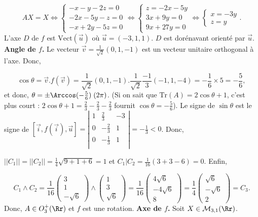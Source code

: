 {{$$AX=X\Leftrightarrow\left\{
\begin{array}{l}
-x-y-2z=0\\
-2x-5y-z=0\\
-x+2y-5z=0
\end{array}
\right.\Leftrightarrow\left\{
\begin{array}{l}
z=-2x-5y\\
3x+9y=0\\
9x+27y=0
\end{array}
\right.\Leftrightarrow\left\{
\begin{array}{l}
x=-3y\\
z=y
\end{array}
\right..$$ 
L'axe $D$ de $f$ est $\mbox{Vect}(\overrightarrow{u})$ où $\overrightarrow{u}=(-3,1,1)$. $D$ est dorénavant orienté par $\overrightarrow{u}$.
\textbf{Angle de $f$.} Le vecteur $\overrightarrow{v}=\frac{1}{\sqrt{2}}(0,1,-1)$ est un vecteur unitaire orthogonal à l'axe. Donc,

$$\cos\theta=\overrightarrow{v}.f(\overrightarrow{v})=\frac{1}{\sqrt{2}}(0,1,-1).\frac{1}{\sqrt{2}}\frac{-1}{3}(-1,1,-4)=-\frac{1}{6}\times5
=-\frac{5}{6},$$
et donc, $\theta=\pm\Arccos(-\frac{5}{6})\;(2\pi)$. (Si on sait que $\text{Tr}(A)=2\cos\theta+1$, c'est plus court : $2\cos\theta+1=\frac{2}{3}-\frac{2}{3}-\frac{2}{3}$ fournit $\cos\theta=-\frac{5}{6}$).
Le signe de $\sin\theta$ est le signe de $[\overrightarrow{i},f(\overrightarrow{i}),\overrightarrow{u}]=\left|
\begin{array}{ccc}
1&\frac{2}{3}&-3\\
0&-\frac{2}{3}&1\\
0&-\frac{1}{3}&1\\
\end{array}
\right|=-\frac{1}{3}<0$. Donc, 

\begin{center}
\end{center}
$||C_1||=||C_2||=\frac{1}{4}\sqrt{9+1+6}=1$ et $C_1|C_2=\frac{1}{16}(3+3-6)=0$. Enfin, 

$$C_1\wedge C_2=\frac{1}{16}\left(
\begin{array}{c}
3\\
1\\
-\sqrt{6}
\end{array}
\right)\wedge\left(
\begin{array}{c}
1\\
3\\
\sqrt{6}
\end{array}
\right)
=\frac{1}{16}\left(
\begin{array}{c}
4\sqrt{6}\\
-4\sqrt{6}\\
8
\end{array}
\right)=\frac{1}{4}\left(
\begin{array}{c}
\sqrt{6}\\
-\sqrt{6}\\
2
\end{array}
\right)
=C_3.$$
Donc, $A\in O_3^+(\Rr)$ et $f$ est une rotation.
\textbf{Axe de $f$.} Soit $X\in\mathcal{M}_{3,1}(\Rr)$.

}}
